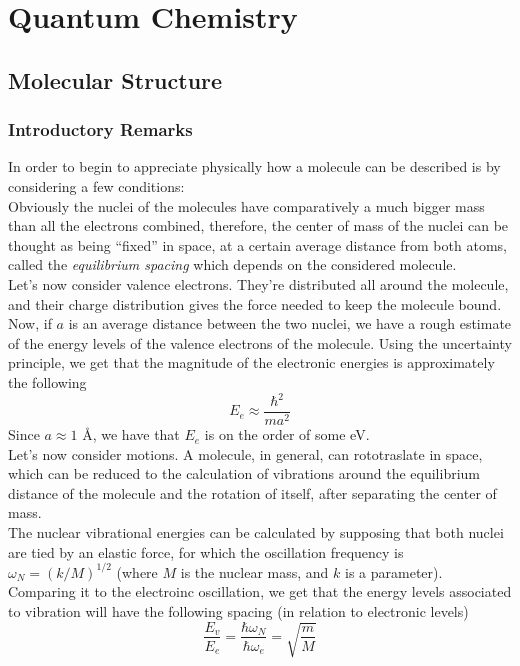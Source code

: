 \documentclass[a4paper, 11pt]{book}
\newcommand{\1}{\opr{\mathds{1}}}
\theoremstyle{plain}
\begin{document}
	\part{Quantum Chemistry}
	\chapter{Molecular Structure}
	\section{Introductory Remarks}
	In order to begin to appreciate physically how a molecule can be described is by considering a few conditions:\\
	Obviously the nuclei of the molecules have comparatively a much bigger mass than all the electrons combined, therefore, the center of mass of the nuclei can be thought as being ``fixed'' in space, at a certain average distance from both atoms, called the \textit{equilibrium spacing} which depends on the considered molecule.\\
	Let's now consider valence electrons. They're distributed all around the molecule, and their charge distribution gives the force needed to keep the molecule bound. Now, if $a$ is an average distance between the two nuclei, we have a rough estimate of the energy levels of the valence electrons of the molecule. Using the uncertainty principle, we get that the magnitude of the electronic energies is approximately the following
	\begin{equation*}
		E_e\approx\frac{\hbar^2}{ma^2}
	\end{equation*}
	Since $a\approx1$ \AA, we have that $E_e$ is on the order of some eV.\\
	Let's now consider motions. A molecule, in general, can rototraslate in space, which can be reduced to the calculation of vibrations around the equilibrium distance of the molecule and the rotation of itself, after separating the center of mass.\\
	The nuclear vibrational energies can be calculated by supposing that both nuclei are tied by an elastic force, for which the oscillation frequency is $\omega_N=(k/M)^{1/2}$ (where $M$ is the nuclear mass, and $k$ is a parameter). Comparing it to the electroinc oscillation, we get that the energy levels associated to vibration will have the following spacing (in relation to electronic levels)
	\begin{equation*}
		\frac{E_v}{E_e}=\frac{\hbar\omega_N}{\hbar\omega_e}=\sqrt{\frac{m}{M}}
	\end{equation*}
\end{document}
